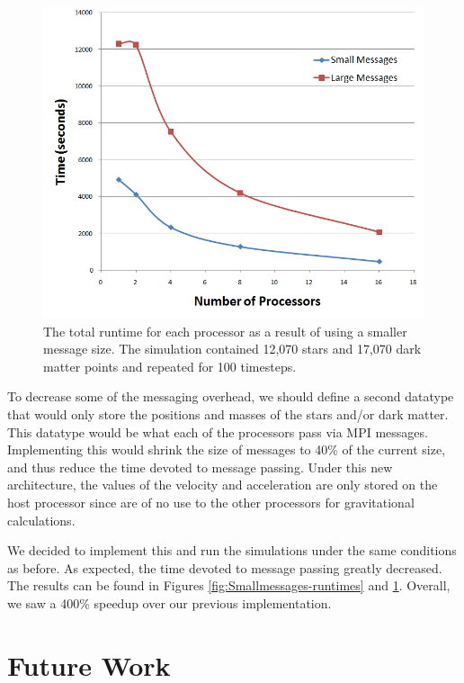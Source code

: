 \documentclass{article}
\begin{document}
\begin{figure}
\centering
\includegraphics[width=\columnwidth]{Smallmessages-total.png}
\caption{The total runtime for each processor as a result of using a smaller message size. The simulation contained 12,070 stars and 17,070 dark matter points and repeated for 100 timesteps. \label{fig:Smallmessages-total}}
\end{figure} 
 
To decrease some of the messaging overhead, we should define a second datatype that would only store the positions and masses of the stars and/or dark matter.  This datatype would be what each of the processors pass via MPI messages.  Implementing this would shrink the size of messages to 40\% of the current size, and thus reduce the time devoted to message passing.  Under this new architecture, the values of the velocity and acceleration are only stored on the host processor since are of no use to the other processors for gravitational calculations.  

We decided to implement this and run the simulations under the same conditions as before.  As expected, the time devoted to message passing greatly decreased.  The results can be found in Figures \ref{fig:Smallmessages-runtimes} and \ref{fig:Smallmessages-total}.  Overall, we saw a 400\% speedup over our previous implementation.

\section{Future Work}
\end{document}
